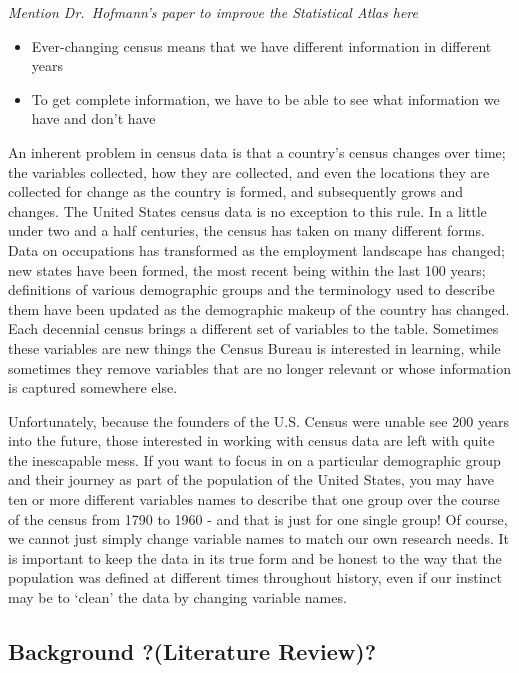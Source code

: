 \documentclass[11pt,]{article}
\begin{document}
\emph{Mention Dr.~Hofmann's paper to improve the Statistical Atlas here}

\begin{itemize}
\item
  Ever-changing census means that we have different information in
  different years
\item
  To get complete information, we have to be able to see what
  information we have and don't have
\end{itemize}

An inherent problem in census data is that a country's census changes
over time; the variables collected, how they are collected, and even the
locations they are collected for change as the country is formed, and
subsequently grows and changes. The United States census data is no
exception to this rule. In a little under two and a half centuries, the
census has taken on many different forms. Data on occupations has
transformed as the employment landscape has changed; new states have
been formed, the most recent being within the last 100 years;
definitions of various demographic groups and the terminology used to
describe them have been updated as the demographic makeup of the country
has changed. Each decennial census brings a different set of variables
to the table. Sometimes these variables are new things the Census Bureau
is interested in learning, while sometimes they remove variables that
are no longer relevant or whose information is captured somewhere else.

Unfortunately, because the founders of the U.S. Census were unable see
200 years into the future, those interested in working with census data
are left with quite the inescapable mess. If you want to focus in on a
particular demographic group and their journey as part of the population
of the United States, you may have ten or more different variables names
to describe that one group over the course of the census from 1790 to
1960 - and that is just for one single group! Of course, we cannot just
simply change variable names to match our own research needs. It is
important to keep the data in its true form and be honest to the way
that the population was defined at different times throughout history,
even if our instinct may be to `clean' the data by changing variable
names.

\subsection{Background ?(Literature
Review)?}\label{background-literature-review}
\end{document}
